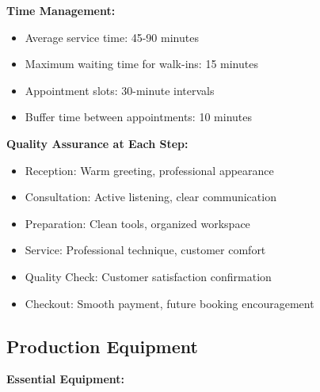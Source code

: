 \documentclass[a4paper,12pt]{article}
\begin{document}
\vspace{1em}

\begin{tcolorbox}[mybox, title=\textbf{Process Efficiency Measures}]
\textbf{Time Management:}
\begin{itemize}[leftmargin=1em, itemsep=0pt]
    \item Average service time: 45-90 minutes
    \item Maximum waiting time for walk-ins: 15 minutes
    \item Appointment slots: 30-minute intervals
    \item Buffer time between appointments: 10 minutes
\end{itemize}

\textbf{Quality Assurance at Each Step:}
\begin{itemize}[leftmargin=1em, itemsep=0pt]
    \item Reception: Warm greeting, professional appearance
    \item Consultation: Active listening, clear communication
    \item Preparation: Clean tools, organized workspace
    \item Service: Professional technique, customer comfort
    \item Quality Check: Customer satisfaction confirmation
    \item Checkout: Smooth payment, future booking encouragement
\end{itemize}
\end{tcolorbox}

\subsection{Production Equipment}

\textbf{Essential Equipment:}
\end{document}
